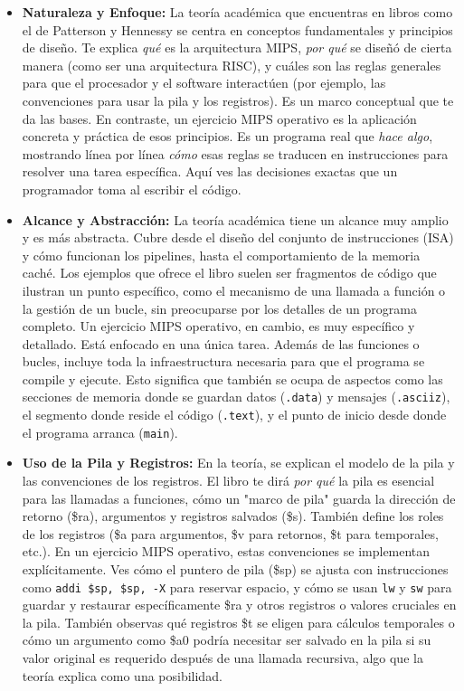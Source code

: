 \documentclass{article}
\begin{document}
\begin{itemize}
    \item \textbf{Naturaleza y Enfoque:} La teoría académica que encuentras en libros como el de Patterson y Hennessy se centra en conceptos fundamentales y principios de diseño. Te explica \textit{qué} es la arquitectura MIPS, \textit{por qué} se diseñó de cierta manera (como ser una arquitectura RISC), y cuáles son las reglas generales para que el procesador y el software interactúen (por ejemplo, las convenciones para usar la pila y los registros). Es un marco conceptual que te da las bases. En contraste, un ejercicio MIPS operativo es la aplicación concreta y práctica de esos principios. Es un programa real que \textit{hace algo}, mostrando línea por línea \textit{cómo} esas reglas se traducen en instrucciones para resolver una tarea específica. Aquí ves las decisiones exactas que un programador toma al escribir el código.
    \item \textbf{Alcance y Abstracción:} La teoría académica tiene un alcance muy amplio y es más abstracta. Cubre desde el diseño del conjunto de instrucciones (ISA) y cómo funcionan los pipelines, hasta el comportamiento de la memoria caché. Los ejemplos que ofrece el libro suelen ser fragmentos de código que ilustran un punto específico, como el mecanismo de una llamada a función o la gestión de un bucle, sin preocuparse por los detalles de un programa completo. Un ejercicio MIPS operativo, en cambio, es muy específico y detallado. Está enfocado en una única tarea. Además de las funciones o bucles, incluye toda la infraestructura necesaria para que el programa se compile y ejecute. Esto significa que también se ocupa de aspectos como las secciones de memoria donde se guardan datos (\texttt{.data}) y mensajes (\texttt{.asciiz}), el segmento donde reside el código (\texttt{.text}), y el punto de inicio desde donde el programa arranca (\texttt{main}).
    \item \textbf{Uso de la Pila y Registros:} En la teoría, se explican el modelo de la pila y las convenciones de los registros. El libro te dirá \textit{por qué} la pila es esencial para las llamadas a funciones, cómo un "marco de pila" guarda la dirección de retorno (\$ra), argumentos y registros salvados (\$s). También define los roles de los registros (\$a para argumentos, \$v para retornos, \$t para temporales, etc.). En un ejercicio MIPS operativo, estas convenciones se implementan explícitamente. Ves cómo el puntero de pila (\$sp) se ajusta con instrucciones como \texttt{addi \$sp, \$sp, -X} para reservar espacio, y cómo se usan \texttt{lw} y \texttt{sw} para guardar y restaurar específicamente \$ra y otros registros o valores cruciales en la pila. También observas qué registros \$t se eligen para cálculos temporales o cómo un argumento como \$a0 podría necesitar ser salvado en la pila si su valor original es requerido después de una llamada recursiva, algo que la teoría explica como una posibilidad.

\end{itemize}
\end{document}
